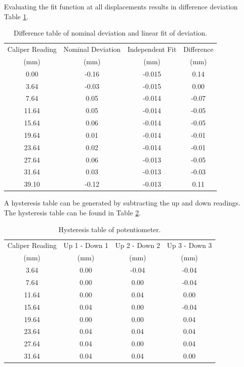 Evaluating the fit function at all displacements results in difference deviation Table \ref{tab:Q1b-diff-deviation-table}.
\begin{table}[h]
    \centering
    \caption{Difference table of nominal deviation and linear fit of deviation.}
    \label{tab:Q1b-diff-deviation-table}
    \begin{tabular}{cccc}
        \hline
        Caliper Reading & Nominal Deviation & Independent Fit & Difference \\
        (mm) & (mm) & (mm) & (mm) \\
        \midrule
        0.00 & -0.16 & -0.015 & {0.14} \\
        3.64 & -0.03 & -0.015 & 0.00 \\
        7.64 & 0.05 & -0.014 & -0.07 \\
        11.64 & 0.05 & -0.014 & -0.05 \\
        15.64 & 0.06 & -0.014 & -0.05 \\
        19.64 & 0.01 & -0.014 & -0.01 \\
        23.64 & 0.02 & -0.014 & -0.01 \\
        27.64 & 0.06 & -0.013 & -0.05 \\
        31.64 & 0.03 & -0.013 & -0.03 \\
        39.10 & -0.12 & -0.013 & 0.11 \\
        \hline
    \end{tabular}
\end{table}

A hysteresis table can be generated by subtracting the up and down readings. The hysteresis table can be found in Table \ref{tab:Q1b-hysteresis-table}.
\begin{table}[h]
    \centering
    \caption{Hysteresis table of potentiometer.}
    \label{tab:Q1b-hysteresis-table}
    \begin{tabular}{cccc}
        \hline
        Caliper Reading & Up 1 - Down 1 & Up 2 - Down 2 & Up 3 - Down 3 \\
        (mm) & (mm) & (mm) & (mm) \\
        \midrule
        3.64 & 0.00 & -0.04 & -0.04 \\
        7.64 & 0.00 & 0.00 & -0.04 \\
        11.64 & 0.00 & 0.04 & 0.00 \\
        15.64 & 0.04 & 0.00 & -0.04 \\
        19.64 & 0.00 & 0.00 & 0.04 \\
        23.64 & 0.04 & 0.04 & 0.04 \\
        27.64 & 0.04 & 0.00 & 0.04 \\
        31.64 & 0.04 & 0.04 & 0.00 \\
        \hline
    \end{tabular}
\end{table}
\FloatBarrier

